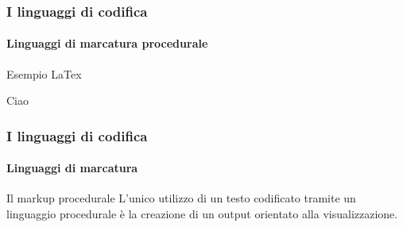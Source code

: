 \documentclass{beamer}
\begin{document}
\begin{frame}
	\frametitle{I linguaggi di codifica}
	\framesubtitle{Linguaggi di marcatura procedurale}
	\addtocounter{nframe}{1}

	\begin{block}{Esempio LaTex}
		\begin{tiny}
			Ciao
		\end{tiny}
	\end{block}

\end{frame}

\begin{frame}
	\frametitle{I linguaggi di codifica}
	\framesubtitle{Linguaggi di marcatura}
	\addtocounter{nframe}{1}

	\begin{block}{Il markup procedurale}
		L’unico utilizzo di un testo codificato tramite un linguaggio procedurale è la creazione di un output orientato alla visualizzazione.
	\end{block}
\end{frame}
\end{document}
